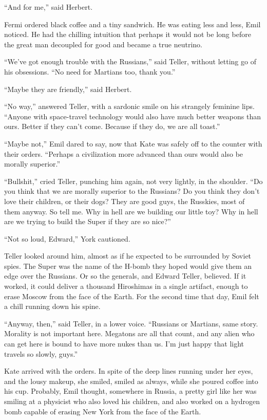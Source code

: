 \documentclass[11pt,a4paper]{article}
\begin{document}
“And for me,” said Herbert.

Fermi ordered black coffee and a tiny sandwich. He was eating less and less, Emil noticed. He had the chilling intuition that perhaps it would not be long before the great man decoupled for good and became a true neutrino.

“We’ve got enough trouble with the Russians,” said Teller, without letting go of his obsessions. “No need for Martians too, thank you.”

“Maybe they are friendly,” said Herbert.

“No way,” answered Teller, with a sardonic smile on his strangely feminine lips. “Anyone with space-travel technology would also have much better weapons than ours. Better if they can’t come. Because if they do, we are all toast.”

“Maybe not,” Emil dared to say, now that Kate was safely off to the counter with their orders. “Perhaps a civilization more advanced than ours would also be morally superior.”

“Bullshit,” cried Teller, punching him again, not very lightly, in the shoulder. “Do you think that we are morally superior to the Russians? Do you think they don’t love their children, or their dogs? They are good guys, the Russkies, most of them anyway. So tell me. Why in hell are we building our little toy? Why in hell are we trying to build the Super if they are so nice?”

“Not so loud, Edward,” York cautioned.

Teller looked around him, almost as if he expected to be surrounded by Soviet spies. The Super was the name of the H-bomb they hoped would give them an edge over the Russians. Or so the generals, and Edward Teller, believed. If it worked, it could deliver a thousand Hiroshimas in a single artifact, enough to erase Moscow from the face of the Earth. For the second time that day, Emil felt a chill running down his spine.

“Anyway, then,” said Teller, in a lower voice. “Russians or Martians, same story. Morality is not important here. Megatons are all that count, and any alien who can get here is bound to have more nukes than us. I’m just happy that light travels so slowly, guys.”

Kate arrived with the orders. In spite of the deep lines running under her eyes, and the lousy makeup, she smiled, smiled as always, while she poured coffee into his cup. Probably, Emil thought, somewhere in Russia, a pretty girl like her was smiling at a physicist who also loved his children, and also worked on a hydrogen bomb capable of erasing New York from the face of the Earth.
\end{document}
